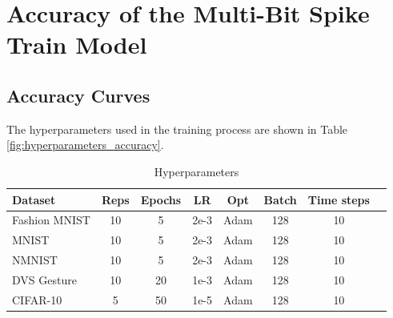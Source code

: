 \chapter{Accuracy of the Multi-Bit Spike Train Model}
\label{appendix:accuracy}

\section{Accuracy Curves}
\label{appendix:accuracy_curves}

    The hyperparameters used in the training process are shown in Table \ref{fig:hyperparameters_accuracy}.

    \begin{table}[H]
        \begin{tabularx}{\textwidth}{|X|c|c|c|c|c|c|c|}
            \toprule
            Dataset & Reps & Epochs & LR & Opt & Batch & Time steps \\
            \midrule
            Fashion MNIST & 10 & 5 & 2e-3 & Adam & 128 & 10 \\
            MNIST & 10 & 5 & 2e-3 & Adam & 128 & 10 \\
            NMNIST & 10 & 5 & 2e-3 & Adam & 128 & 10 \\
            DVS Gesture & 10 & 20 & 1e-3 & Adam & 128 & 10 \\
            CIFAR-10 & 5 & 50 & 1e-5 & Adam & 128 & 10 \\
            \bottomrule
        \end{tabularx}
        \caption{Hyperparameters}
        \label{tab:hyperparameters_accuracy}
    \end{table}

